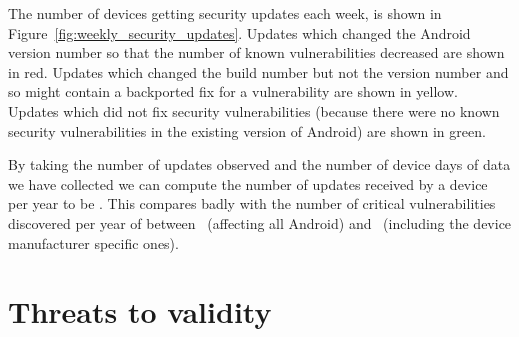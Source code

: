 \documentclass{llncs}
\begin{document}
The number of devices getting security updates each week, is shown in Figure~\ref{fig:weekly_security_updates}.
Updates which changed the Android version number so that the number of known vulnerabilities decreased are shown in red.
Updates which changed the build number but not the version number and so might contain a backported fix for a vulnerability are shown in yellow.
Updates which did not fix security vulnerabilities (because there were no known security vulnerabilities in the existing version of Android) are shown in green.

By taking the number of updates observed and the number of device days of data we have collected we can compute the number of updates received by a device per year to be \daUpdatesPerYear.
This compares badly with the number of critical vulnerabilities discovered per year of between \avoVulnsPerYearAllAndroid\ (affecting all Android) and \avoVulnsPerYear\ (including the device manufacturer specific ones).





\section{Threats to validity}
\label{sec:validity}
\end{document}
